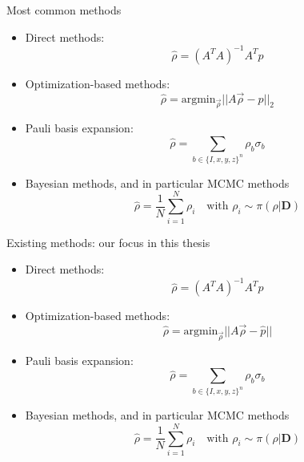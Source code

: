 \documentclass{beamer}
\newcommand{\mb}{\mathbf}
\newcommand{\semitransp}[2][35]{\textcolor{fg!#1}{#2}}
\begin{document}
\begin{frame}{Most common methods}
    \begin{itemize}
        \item Direct methods: \begin{equation}
            \hat \rho = (A^TA)^{-1}A^T \hat p
        \end{equation}
        \item Optimization-based methods: \begin{equation}
            \hat \rho = \text{argmin}_{\vec\rho} ||A \vec\rho - \hat p||_2
        \end{equation} 
        \item Pauli basis expansion:\begin{equation}
            \hat \rho = \sum_{b\in\{I,x,y,z\}^n} \rho_b \sigma_b
        \end{equation}
        \item Bayesian methods, and in particular MCMC methods
        \begin{equation}
        \hat \rho = \frac{1}{N}\sum_{i=1}^N \rho_i \quad \text{with } \rho_i \sim \pi(\rho|\mb D)
        \end{equation}
    \end{itemize}
\end{frame}
\begin{frame}{Existing methods: our focus in this thesis}
    \begin{itemize}
        \item<0> Direct methods: \begin{equation}
            \hat \rho = (A^TA)^{-1}A^T \hat p
        \end{equation}
        \item<0> Optimization-based methods: \begin{equation}
            \hat \rho = \text{argmin}_{\vec\rho} ||A \vec\rho - \hat p||
        \end{equation} 
        \item<0> Pauli basis expansion:
        \begin{equation}
            \hat \rho = \sum_{b\in\{I,x,y,z\}^n} \rho_b \sigma_b
        \end{equation}
        \item<1> Bayesian methods, and in particular MCMC methods
        \begin{equation}
        \hat \rho = \frac{1}{N}\sum_{i=1}^N \rho_i \quad \text{with } \rho_i \sim \pi(\rho|\mb D)
        \end{equation}
    \end{itemize}
\end{frame}
\end{document}
